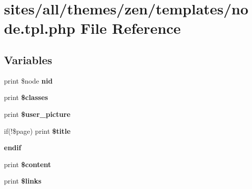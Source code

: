 \hypertarget{sites_2all_2themes_2zen_2templates_2node_8tpl_8php}{
\section{sites/all/themes/zen/templates/node.tpl.php File Reference}
\label{sites_2all_2themes_2zen_2templates_2node_8tpl_8php}
}
\subsection*{Variables}
\begin{CompactItemize}
\item 
\hypertarget{sites_2all_2themes_2zen_2templates_2node_8tpl_8php_ff83bc4c67cdf5b085d181488eea273f}{
print \$node \textbf{nid}}
\label{sites_2all_2themes_2zen_2templates_2node_8tpl_8php_ff83bc4c67cdf5b085d181488eea273f}

\item 
\hypertarget{sites_2all_2themes_2zen_2templates_2node_8tpl_8php_6d48ecbdbc70ca1812e665169b5fa1e2}{
print \textbf{\$classes}}
\label{sites_2all_2themes_2zen_2templates_2node_8tpl_8php_6d48ecbdbc70ca1812e665169b5fa1e2}

\item 
\hypertarget{sites_2all_2themes_2zen_2templates_2node_8tpl_8php_2662269aca0f9faedd1ee9e41828ea4c}{
print \textbf{\$user\_\-picture}}
\label{sites_2all_2themes_2zen_2templates_2node_8tpl_8php_2662269aca0f9faedd1ee9e41828ea4c}

\item 
\hypertarget{sites_2all_2themes_2zen_2templates_2node_8tpl_8php_935a0f09673d9871fb63d348f35f4e67}{
if(!\$page) print \textbf{\$title}}
\label{sites_2all_2themes_2zen_2templates_2node_8tpl_8php_935a0f09673d9871fb63d348f35f4e67}

\item 
\hypertarget{sites_2all_2themes_2zen_2templates_2node_8tpl_8php_82cd33ca97ff99f2fcc5e9c81d65251b}{
\textbf{endif}}
\label{sites_2all_2themes_2zen_2templates_2node_8tpl_8php_82cd33ca97ff99f2fcc5e9c81d65251b}

\item 
\hypertarget{sites_2all_2themes_2zen_2templates_2node_8tpl_8php_b7b7210f43aa78e34f0b202de894a74c}{
print \textbf{\$content}}
\label{sites_2all_2themes_2zen_2templates_2node_8tpl_8php_b7b7210f43aa78e34f0b202de894a74c}

\item 
\hypertarget{sites_2all_2themes_2zen_2templates_2node_8tpl_8php_67aa641b75422875f72695353fd225ca}{
print \textbf{\$links}}
\label{sites_2all_2themes_2zen_2templates_2node_8tpl_8php_67aa641b75422875f72695353fd225ca}

\end{CompactItemize}


